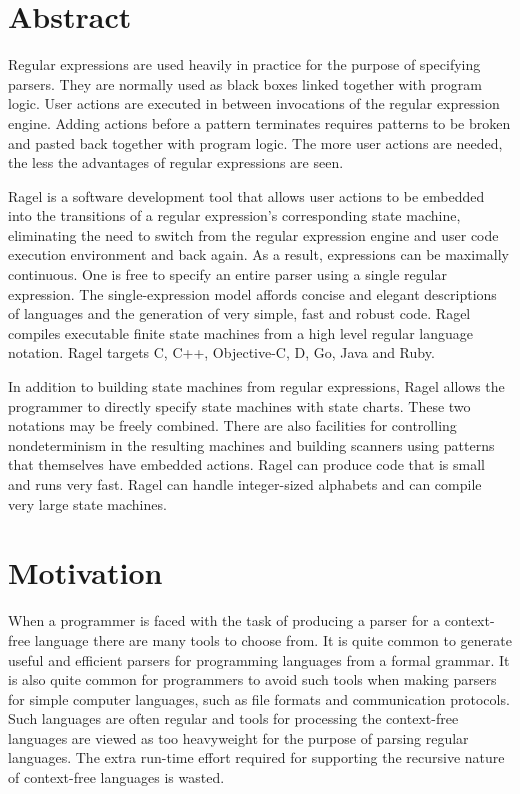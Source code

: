 \documentclass[letterpaper,11pt,oneside]{book}
\begin{document}
\section{Abstract}

Regular expressions are used heavily in practice for the purpose of specifying
parsers. They are normally used as black boxes linked together with program
logic.  User actions are executed in between invocations of the regular
expression engine. Adding actions before a pattern terminates requires patterns
to be broken and pasted back together with program logic. The more user actions
are needed, the less the advantages of regular expressions are seen. 

Ragel is a software development tool that allows user actions to be 
embedded into the transitions of a regular expression's corresponding state
machine, eliminating the need to switch from the regular expression engine and
user code execution environment and back again. As a result, expressions can be
maximally continuous.  One is free to specify an entire parser using a single
regular expression.  The single-expression model affords concise and elegant
descriptions of languages and the generation of very simple, fast and robust
code.  Ragel compiles executable finite state machines from a high level regular language
notation. Ragel targets C, C++, Objective-C, D, Go, Java and Ruby.

In addition to building state machines from regular expressions, Ragel allows
the programmer to directly specify state machines with state charts. These two
notations may be freely combined. There are also facilities for controlling
nondeterminism in the resulting machines and building scanners using patterns
that themselves have embedded actions. Ragel can produce code that is small and
runs very fast. Ragel can handle integer-sized alphabets and can compile very
large state machines.

\section{Motivation}

When a programmer is faced with the task of producing a parser for a
context-free language there are many tools to choose from. It is quite common
to generate useful and efficient parsers for programming languages from a
formal grammar. It is also quite common for programmers to avoid such tools
when making parsers for simple computer languages, such as file formats and
communication protocols.  Such languages are often regular and tools for
processing the context-free languages are viewed as too heavyweight for the
purpose of parsing regular languages. The extra run-time effort required for
supporting the recursive nature of context-free languages is wasted.
\end{document}
